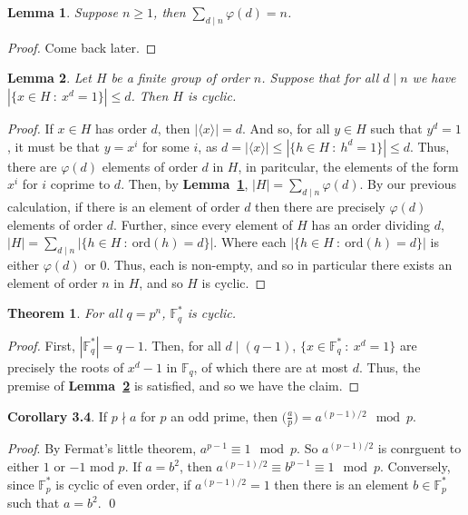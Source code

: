 \documentclass[12pt]{article}
\newcommand{\g}[1]{\langle #1 \rangle}
\newcommand{\ord}{\text{ord}}
\newcommand{\lref}[1]{\textbf{Lemma~\ref{#1}}}
\newtheorem{thm}{Theorem}
\newtheorem{lemma}{Lemma}
\numberwithin{equation}{section}
\numberwithin{thm}{section}
\numberwithin{lemma}{section}
\numberwithin{cor}{section}
\begin{document}
\begin{lemma}\label{SumOfTotient}
  Suppose $n \geq 1$, then $\sum_{d \mid n} \varphi(d) = n$.
\end{lemma}
\begin{proof}
  Come back later.
\end{proof}

\begin{lemma}\label{CyclicGroupSufficientCondition}
  Let $H$ be a finite group of order $n$. Suppose that for all $d \mid n$ we have $|\{ x \in H \ : \ x^d = 1 \}| \leq d$. Then $H$ is cyclic.
\end{lemma}
\begin{proof}
  If $x \in H$ has order $d$, then $|\g{x}| = d$. And so, for all $y \in H$ such that $y^d = 1$, it must be that $y = x^i$ for some $i$, as $d = |\g{x}| \leq |\{ h \in H \ : \ h^d = 1 \}| \leq d$. Thus, there are $\varphi(d)$ elements of order $d$ in $H$, in paritcular, the elements of the form $x^i$ for $i$ coprime to $d$. Then, by \lref{SumOfTotient}, $|H| = \sum_{d \mid n} \varphi(d)$. By our previous calculation, if there is an element of order $d$ then there are precisely $\varphi(d)$ elements of order $d$. Further, since every element of $H$ has an order dividing $d$, $|H| = \sum_{d \mid n} |\{ h \in H \ : \ \ord(h) = d \}|$. Where each $|\{ h \in H \ : \ \ord(h) = d\}|$ is either $\varphi(d)$ or $0$. Thus, each is non-empty, and so in particular there exists an element of order $n$ in $H$, and so $H$ is cyclic.
\end{proof}

\begin{thm}\label{FiniteFieldMultiplicativeGroupIsCyclic}
  For all $q = p^n$, $\mathbb{F}_q^*$ is cyclic.
\end{thm}
\begin{proof}
  First, $|\mathbb{F}_q^*| = q - 1$. Then, for all $d \mid (q - 1)$, $\{ x \in \mathbb{F}_q^* \ : \ x^d = 1 \}$ are precisely the roots of $x^d - 1$ in $\mathbb{F}_q$, of which there are at most $d$. Thus, the premise of \lref{CyclicGroupSufficientCondition} is satisfied, and so we have the claim.
\end{proof}

\textbf{Corollary 3.4}. If $p \nmid a$ for $p$ an odd prime, then $\big( \frac{a}{p} \big) = a^{(p-1)/2} \mod p$.

\textit{Proof}. By Fermat's little theorem, $a^{p-1} \equiv 1 \mod p$. So $a^{(p-1)/2}$ is conrguent to either $1$ or $-1$ mod $p$. If $a = b^2$, then $a^{(p-1)/2} \equiv b^{p-1} \equiv 1 \mod p$. Conversely, since $\mathbb{F}_p^*$ is cyclic of even order, if $a^{(p-1)/2} = 1$ then there is an element $b \in \mathbb{F}_p^*$ such that $a = b^2$. \qed
\end{document}

